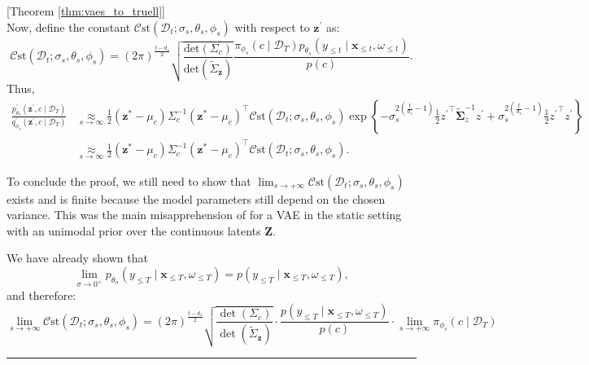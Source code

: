 \documentclass[10pt]{article} %
\newcommand{\BlackBox}{\rule{1.5ex}{1.5ex}}  %
\renewenvironment{proof}{\par\noindent{\bf Proof\ }}{\hfill\BlackBox\\[2mm]}
\newenvironment{proof}{\par\noindent{\bf Proof\ }}{\hfill\BlackBox\\[2mm]}
\begin{document}
\begin{proof}[Theorem \ref{thm:vaes_to_truell}]
\[\]
Now, define the constant $\mathcal{C}\mathrm{st}(\mathcal{D}_t; \sigma_s, \theta_s, \phi_s)$ with respect to $\mathbf{z}^{\prime}$ as:
\[
\mathcal{C}\mathrm{st}(\mathcal{D}_t; \sigma_s, \theta_s, \phi_s) = (2\pi)^{\frac{t-d_z}{2}}
\sqrt{\frac{
\mathrm{det}(\Sigma_{c})
}{
\mathrm{det}(\tilde{\Sigma}_{\mathbf{z}})
}}
\frac{
\pi_{\phi_{s}}(c \mid \mathcal{D}_T) p_{\theta_{s}}\left(y_{\leq t} \mid \mathbf{x}_{\leq t}, \omega_{\leq t}\right)
}{
p(c)}.
\]
Thus,
\[
\begin{aligned}
\frac{p_{\theta_{s}}^{\prime}\left(\mathbf{z}^{\prime}, c \mid \mathcal{D}_T\right)}{q_{\phi_{s}}^{\prime}(\mathbf{z}^{\prime}, c \mid \mathcal{D}_T)} 
&\underset{s \to \infty}{\approx} \frac{1}{2}(\mathbf{z}^* - \mu_c) \Sigma_c^{-1} (\mathbf{z}^* - \mu_c)^{\top} \mathcal{C}\mathrm{st}(\mathcal{D}_t; \sigma_s, \theta_s, \phi_s) \exp \left\{-\sigma_{s}^{2(\frac{t}{d_z}-1)}\frac{1}{2}{z^{\prime}}^{\top} \tilde{\mathbf{\Sigma}}_z^{-1} z^{\prime} + \sigma_{s}^{2(\frac{t}{d_z}-1)} \frac{1}{2}{z^{\prime}}^{\top} z^{\prime}\right\} \\
&\underset{s \to \infty}{\approx} \frac{1}{2}(\mathbf{z}^* - \mu_c) \Sigma_c^{-1} (\mathbf{z}^* - \mu_c)^{\top} \mathcal{C}\mathrm{st}(\mathcal{D}_t; \sigma_s, \theta_s, \phi_s).
\end{aligned}
\]

To conclude the proof, we still need to show that 
\(\lim_{s \to +\infty} \mathcal{C}\mathrm{st}(\mathcal{D}_t; \sigma_s, \theta_s, \phi_s)\) exists and is finite because the model parameters still depend on the chosen variance.  This was the main misapprehension of \cite{dai2018diagnosingvae} for a VAE in the static setting with an unimodal prior over the continuous latents \(\mathbf{Z}\).

We have already shown that 
\[
\lim_{\sigma \to 0^+} p_{\theta_{\sigma}}(y_{\leq T} \mid \mathbf{x}_{\leq T}, \omega_{\leq T}) = p(y_{\leq T} \mid \mathbf{x}_{\leq T}, \omega_{\leq T}),
\]
and therefore:
\begin{equation*}
\lim_{s \to +\infty} \mathcal{C}\mathrm{st}(\mathcal{D}_t; \sigma_s, \theta_s, \phi_s) = 
(2\pi)^{\frac{t-d_z}{2}}
\sqrt{\frac{
\det(\Sigma_{c})
}{
\det(\tilde{\Sigma}_{\mathbf{z}})
}}
\cdot
\frac{
p(y_{\leq T} \mid \mathbf{x}_{\leq T}, \omega_{\leq T})
}{
p(c)
}
\cdot
\lim_{s \to +\infty} \pi_{\phi_{s}}(c \mid \mathcal{D}_T)
\end{equation*}


\end{proof}
\end{document}
